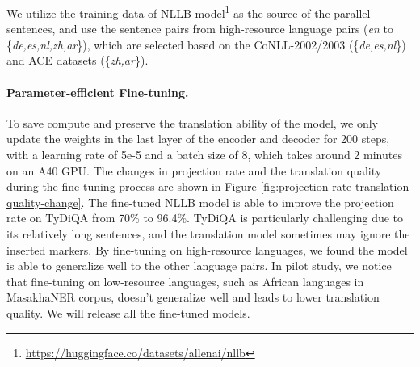 \documentclass[11pt,dvipsnames]{article}
\begin{document}
 We utilize the training  data of  NLLB model\footnote{\url{https://huggingface.co/datasets/allenai/nllb}} as the source of the parallel sentences, and use the sentence pairs  from high-resource language pairs (\textit{en} to \{\textit{de,es,nl,zh,ar}\}), which are selected based on the CoNLL-2002/2003 (\{\textit{de,es,nl}\}) and ACE datasets (\{\textit{zh,ar}\}). 








\paragraph{Parameter-efficient Fine-tuning.} To save compute and preserve the translation ability of the model, we  only update the weights in  the last  layer of the encoder and decoder for 200 steps, with a learning rate of 5e-5 and a batch size of 8, which takes around 2 minutes on an A40 GPU. The changes in projection rate and the translation quality during the fine-tuning process are shown in Figure \ref{fig:projection-rate-translation-quality-change}.
The fine-tuned NLLB model is able to improve the projection rate on TyDiQA from 70\% to 96.4\%. TyDiQA is particularly challenging due to its relatively long sentences, and  the translation model sometimes may ignore the inserted markers. 
By fine-tuning on high-resource languages, we found the   model is able to generalize well to the other language pairs. In pilot study, we notice that fine-tuning on low-resource languages, such as African languages in MasakhaNER corpus,  doesn't generalize well and  leads to lower translation quality. We will release all the fine-tuned models.
\end{document}

